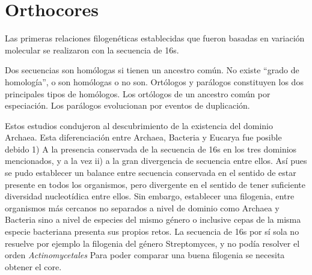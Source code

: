 \documentclass[]{article}
\title{}
\author{}
\date{}
\newenvironment{Shaded}{\begin{snugshade}}{\end{snugshade}}
\newcommand{\KeywordTok}[1]{\textcolor[rgb]{0.13,0.29,0.53}{\textbf{#1}}}
\newcommand{\DataTypeTok}[1]{\textcolor[rgb]{0.13,0.29,0.53}{#1}}
\newcommand{\StringTok}[1]{\textcolor[rgb]{0.31,0.60,0.02}{#1}}
\newcommand{\CommentTok}[1]{\textcolor[rgb]{0.56,0.35,0.01}{\textit{#1}}}
\newcommand{\ControlFlowTok}[1]{\textcolor[rgb]{0.13,0.29,0.53}{\textbf{#1}}}
\newcommand{\OperatorTok}[1]{\textcolor[rgb]{0.81,0.36,0.00}{\textbf{#1}}}
\newcommand{\NormalTok}[1]{#1}
\begin{document}
\begin{Shaded}
\end{Shaded}

\section{Orthocores}\label{orthocores}

Las primeras relaciones filogenéticas establecidas que fueron basadas en
variación molecular se realizaron con la secuencia de 16s.

Dos secuencias son homólogas si tienen un ancestro común. No existe
``grado de homología'', o son homólogas o no son. Ortólogos y parálogos
constituyen los dos principales tipos de homólogos. Los ortólogos de un
ancestro común por especiación. Los parálogos evolucionan por eventos de
duplicación.

Estos estudios condujeron al descubrimiento de la existencia del dominio
Archaea. Esta diferenciación entre Archaea, Bacteria y Eucarya fue
posible debido 1) A la presencia conservada de la secuencia de 16s en
los tres dominios mencionados, y a la vez ii) a la gran divergencia de
secuencia entre ellos. Así pues se pudo establecer un balance entre
secuencia conservada en el sentido de estar presente en todos los
organismos, pero divergente en el sentido de tener suficiente diversidad
nucleotídica entre ellos. Sin embargo, establecer una filogenia, entre
organismos más cercanos no separados a nivel de dominio como Archaea y
Bacteria sino a nivel de especies del mismo género o inclusive cepas de
la misma especie bacteriana presenta sus propios retos. La secuencia de
16s por sí sola no resuelve por ejemplo la filogenia del género
Streptomyces, y no podía resolver el orden \emph{Actinomycetales} Para
poder comparar una buena filogenia se necesita obtener el core.
\end{document}
